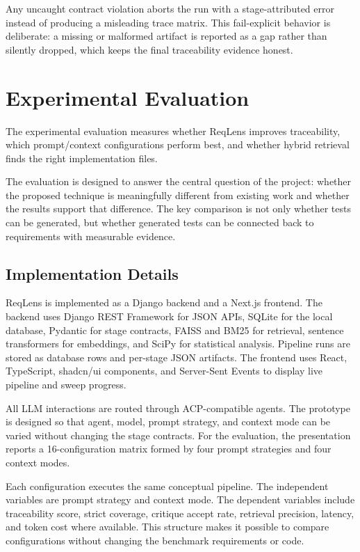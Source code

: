 \documentclass[conference]{IEEEtran}
\begin{document}
Any uncaught contract violation aborts the run with a stage-attributed error
instead of producing a misleading trace matrix. This fail-explicit behavior is
deliberate: a missing or malformed artifact is reported as a gap rather than
silently dropped, which keeps the final traceability evidence honest.

\section{Experimental Evaluation}
The experimental evaluation measures whether ReqLens improves traceability,
which prompt/context configurations perform best, and whether hybrid retrieval
finds the right implementation files.

The evaluation is designed to answer the central question of the project:
whether the proposed technique is meaningfully different from existing work
and whether the results support that difference. The key comparison is not
only whether tests can be generated, but whether generated tests can be
connected back to requirements with measurable evidence.

\subsection{Implementation Details}
ReqLens is implemented as a Django backend and a Next.js frontend. The backend
uses Django REST Framework for JSON APIs, SQLite for the local database,
Pydantic for stage contracts, FAISS and BM25 for retrieval, sentence
transformers for embeddings, and SciPy for statistical analysis. Pipeline runs
are stored as database rows and per-stage JSON artifacts. The frontend uses
React, TypeScript, shadcn/ui components, and Server-Sent Events to display live
pipeline and sweep progress.

All LLM interactions are routed through ACP-compatible agents. The prototype is
designed so that agent, model, prompt strategy, and context mode can be varied
without changing the stage contracts. For the evaluation, the presentation
reports a 16-configuration matrix formed by four prompt strategies and four
context modes.

Each configuration executes the same conceptual pipeline. The independent
variables are prompt strategy and context mode. The dependent variables include
traceability score, strict coverage, critique accept rate, retrieval precision,
latency, and token cost where available. This structure makes it possible to
compare configurations without changing the benchmark requirements or code.
\end{document}
